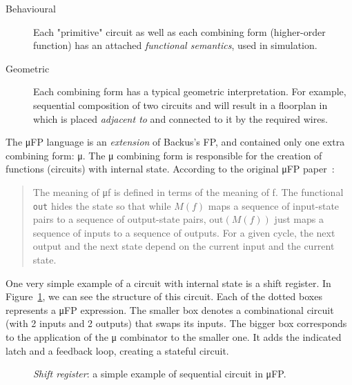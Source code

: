         \begin{description}
            \item[Behavioural]
                Each "primitive" circuit as well as each combining form (higher-order function)
                has an attached \emph{functional semantics}, used in simulation.
            \item[Geometric]
                Each combining form has a typical geometric interpretation.
                For example, sequential composition of two circuits  and  will result
                in a floorplan in which  is placed \emph{adjacent to}  and connected to it
                by the required wires.
        \end{description}

        The μFP language is an \emph{extension} of Backus's FP, and contained only one extra combining form: μ.
        The μ combining form is responsible for the creation of functions (circuits) with internal state.
        According to the original μFP paper~\cite{mufp-1984}:

        \begin{quote}
            The meaning of μf is defined in terms of the meaning of f.
            The functional \texttt{out} hides the state
            so that while $M(f)$ maps a sequence of input-state pairs to a sequence of output-state pairs,
            $\text{out}(M(f))$ just maps a sequence of inputs to a sequence of outputs.
            For a given cycle, the next output and the next state depend on the current input and the current state.
        \end{quote}

        One very simple example of a circuit with internal state is a shift register.
        In Figure~\ref{fig:mufp-shift}, we can see the structure of this circuit.
        Each of the dotted boxes represents a μFP expression.
        The smaller box denotes a combinational circuit (with 2 inputs and 2 outputs) that swaps its inputs.
        The bigger box corresponds to the application of the μ combinator to the smaller one.
        It adds the indicated latch and a feedback loop, creating a stateful circuit.

        \begin{figure}[h]
            \caption{\emph{Shift register}: a simple example of sequential circuit in μFP. \label{fig:mufp-shift}}
        \end{figure}

